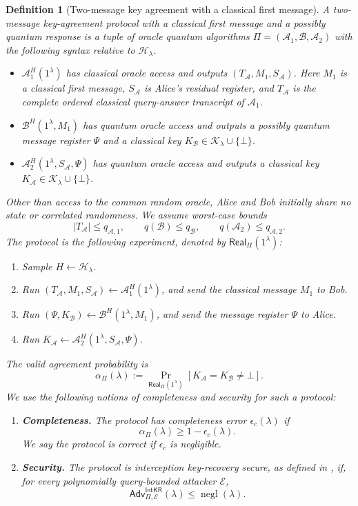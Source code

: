 \documentclass[11pt]{article}
\newcounter{algorithm}
\newtheorem{definition}[definition]{Definition}
\newcommand{\cA}{\mathcal{A}}
\newcommand{\cB}{\mathcal{B}}
\newcommand{\cE}{\mathcal{E}}
\newcommand{\cH}{\mathcal{H}}
\newcommand{\cK}{\mathcal{K}}
\newcommand{\negl}{\operatorname{negl}}
\newcommand{\Real}{\mathsf{Real}}
\newcommand{\IntKR}{\mathsf{IntKR}}
\newcommand{\Adv}{\mathsf{Adv}}
\begin{document}
\begin{definition}[Two-message key agreement with a classical first message]
\label{def:protocol}
A two-message key-agreement protocol with a classical first message and a
possibly quantum response is a tuple of oracle quantum algorithms \(\Pi=(\cA_1,\cB,\cA_2)\) with the
following syntax relative to \(\cH_\lambda\). 
\begin{itemize}[leftmargin=2em]
  \item \(\cA_1^H(1^\lambda)\) has classical oracle access and outputs
  \((T_{\cA},M_1,S_{\cA})\).  Here \(M_1\) is a classical first message,
  \(S_{\cA}\) is Alice's residual register, and \(T_{\cA}\) is the complete
  ordered classical query-answer transcript of \(\cA_1\).
  \item \(\cB^H(1^\lambda,M_1)\) has quantum oracle access and outputs a
  possibly quantum message register \(\Psi\) and a classical key
  \(K_{\cB}\in\cK_\lambda\cup\{\bot\}\).
  \item \(\cA_2^H(1^\lambda,S_{\cA},\Psi)\) has quantum oracle access and
  outputs a classical key \(K_{\cA}\in\cK_\lambda\cup\{\bot\}\).
\end{itemize}
Other than access to the common random oracle, Alice and Bob initially share
no state or correlated randomness.  We assume worst-case bounds
\[
  |T_{\cA}|\le q_{\cA,1},
  \qquad
  q(\cB)\le q_{\cB},
  \qquad
  q(\cA_2)\le q_{\cA,2}.
\] 
The protocol is the following experiment, denoted by \(\Real_\Pi(1^\lambda)\):
\begin{enumerate}[leftmargin=2em]
  \item Sample \(H\leftarrow\cH_\lambda\).
  \item Run
  \((T_{\cA},M_1,S_{\cA})\leftarrow\cA_1^H(1^\lambda)\), and send the
  classical message \(M_1\) to Bob.
  \item Run
  \((\Psi,K_{\cB})\leftarrow\cB^H(1^\lambda,M_1)\), and send the
  message register \(\Psi\) to Alice.
  \item Run
  \(K_{\cA}\leftarrow\cA_2^H(1^\lambda,S_{\cA},\Psi)\).
\end{enumerate}
The valid agreement probability is
\[
  \alpha_\Pi(\lambda)
  :=
  \Pr_{\Real_\Pi(1^\lambda)}
  [K_{\cA}=K_{\cB}\neq\bot].
\]
We use the following notions of completeness and security for such a protocol:

\begin{enumerate}[leftmargin=2em,label=\textup{(\roman*)}]
  \item \textbf{Completeness.}  The protocol has completeness error
  \(\epsilon_c(\lambda)\) if
  \[
    \alpha_\Pi(\lambda)\ge 1-\epsilon_c(\lambda).
  \]
  We say the protocol is \emph{correct} if \(\epsilon_c\) is negligible.
  \item \textbf{Security.}  The protocol is interception key-recovery secure,
  as defined in , if, for every polynomially query-bounded attacker
  \(\cE\),
  \begin{equation}
    \Adv^{\IntKR}_{\Pi,\cE}(\lambda) \leq \negl(\lambda).
  \end{equation}

\end{enumerate}
\end{definition}
\end{document}
